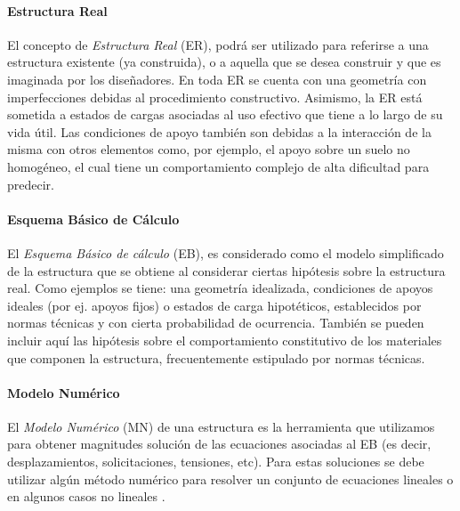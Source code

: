 \paragraph{Estructura Real}
%
El concepto de \textit{Estructura Real} (ER), podrá ser utilizado para referirse a una estructura existente (ya construida), o a aquella que se desea construir y que es imaginada por los diseñadores. %
%
En toda ER se cuenta con una geometría con imperfecciones debidas al procedimiento constructivo. %
Asimismo, la ER está sometida a estados de cargas asociadas al uso efectivo que tiene a lo largo de su vida útil. %
%
Las condiciones de apoyo también son debidas a la interacción de la misma con otros elementos como, por ejemplo, el apoyo sobre un suelo no homogéneo, el cual tiene un comportamiento complejo de alta dificultad para predecir.


\paragraph{Esquema Básico de Cálculo}
%
El \textit{Esquema Básico de cálculo} (EB), es considerado como el modelo simplificado de la estructura que se obtiene al considerar ciertas hipótesis sobre la estructura real. %
%
Como ejemplos se tiene: una geometría idealizada, condiciones de apoyos ideales (por ej. apoyos fijos) o estados de carga hipotéticos, establecidos por normas técnicas y con cierta probabilidad de ocurrencia. %
%
También se pueden incluir aquí las hipótesis sobre el comportamiento constitutivo de los materiales que componen la estructura, frecuentemente estipulado por normas técnicas.

\paragraph{Modelo Numérico}
%
El \textit{Modelo Numérico} (MN) de una estructura es la herramienta que utilizamos para obtener magnitudes solución de las ecuaciones asociadas al EB (es decir, desplazamientos, solicitaciones, tensiones, etc). %
%
Para estas soluciones se debe utilizar algún método numérico para resolver un conjunto de ecuaciones lineales o en algunos casos no lineales \citep{Bazzano2017}. %
%


